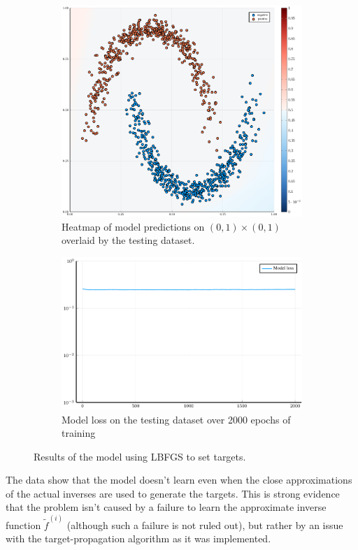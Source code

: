 \begin{figure}
	\centering
	\begin{subfigure}{0.49\textwidth}
		\centering
		\includegraphics[width=\textwidth]{images/lbfgs-heatmap/lbfgs.pdf}
		\caption{Heatmap of model predictions on \( \left( 0, 1 \right) \times \left( 0, 1 \right) \) overlaid by the testing dataset.}
	\end{subfigure}
	\begin{subfigure}{0.49\textwidth}
		\centering
		\includegraphics[width=\textwidth]{images/lbfgs-modelloss/lbfgs.pdf}
		\caption{Model loss on the testing dataset over 2000 epochs of training}
	\end{subfigure}
	\caption{Results of the model using LBFGS to set targets.}\label{lbfgs}
\end{figure}

The data show that the model doesn't learn even when the close approximations of the actual inverses are used to generate the targets. This is strong evidence that the problem isn't caused by a failure to learn the approximate inverse function \( \widetilde{f}^{(i)} \) (although such a failure is not ruled out), but rather by an issue with the target-propagation algorithm as it was implemented.

